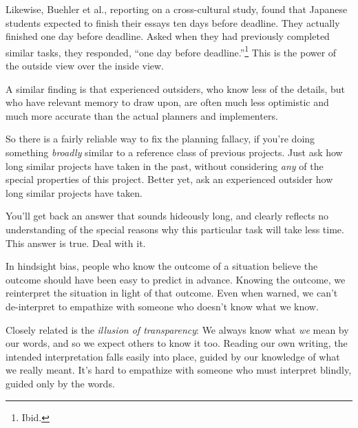 {
 Likewise, Buehler et al., reporting on a cross-cultural study,
found that Japanese students expected to finish their essays ten days
before deadline. They actually finished one day before deadline. Asked
when they had previously completed similar tasks, they responded,
``one day before
deadline.''\footnote{Ibid.} This is the power of
the outside view over the inside view.}

{
 A similar finding is that experienced outsiders, who know less of
the details, but who have relevant memory to draw upon, are often much
less optimistic and much more accurate than the actual planners and
implementers.}

{
 So there is a fairly reliable way to fix the planning fallacy, if
you're doing something \textit{broadly} similar to a
reference class of previous projects. Just ask how long similar
projects have taken in the past, without considering \textit{any} of
the special properties of this project. Better yet, ask an experienced
outsider how long similar projects have taken.}

{
 You'll get back an answer that sounds hideously
long, and clearly reflects no understanding of the special reasons why
this particular task will take less time. This answer is true. Deal
with it.}

\myendsectiontext


\bigskip


{
 In hindsight bias, people who know the outcome of a situation
believe the outcome should have been easy to predict in advance.
Knowing the outcome, we reinterpret the situation in light of that
outcome. Even when warned, we can't de-interpret to
empathize with someone who doesn't know what we know. }

{
 Closely related is the \textit{illusion of transparency}: We
always know what \textit{we} mean by our words, and so we expect others
to know it too. Reading our own writing, the intended interpretation
falls easily into place, guided by our knowledge of what we really
meant. It's hard to empathize with someone who must
interpret blindly, guided only by the words.}

